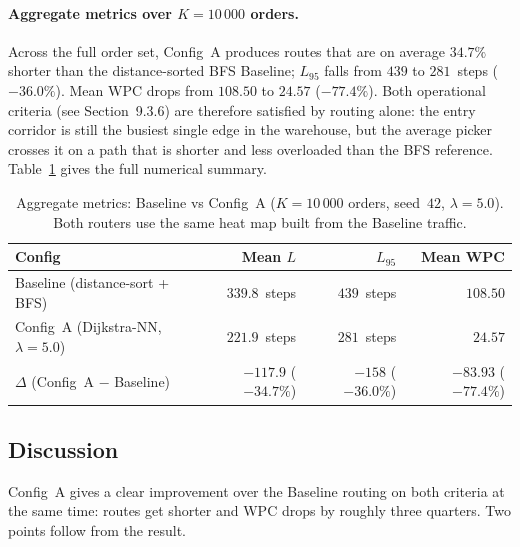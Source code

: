 \documentclass[12pt,a4paper]{article}
\begin{document}
\paragraph{Aggregate metrics over $K = 10\,000$ orders.}
Across the full order set, Config~A produces routes that are on average
$34.7\%$ shorter than the distance-sorted BFS Baseline; $L_{95}$ falls from
$439$ to $281$~steps ($-36.0\%$).
Mean WPC drops from $108.50$ to $24.57$ ($-77.4\%$).
Both operational criteria (see Section~9.3.6) are therefore satisfied by
routing alone: the entry corridor is still the busiest single edge in the
warehouse, but the average picker crosses it on a path that is shorter
and less overloaded than the BFS reference.
Table~\ref{tab:metrics_aggregate} gives the full numerical summary.

\begin{table}[!ht]
\centering
\caption{Aggregate metrics: Baseline vs Config~A ($K = 10\,000$ orders,
  seed~$42$, $\lambda = 5.0$). Both routers use the same heat map built
  from the Baseline traffic.}
\label{tab:metrics_aggregate}
\begin{tabular}{lrrr}
\hline
\textbf{Config} & \textbf{Mean $L$} & \textbf{$L_{95}$} & \textbf{Mean WPC} \\
\hline
Baseline (distance-sort + BFS)            & $339.8$~steps & $439$~steps & $108.50$ \\
Config~A (Dijkstra-NN, $\lambda = 5.0$)   & $221.9$~steps & $281$~steps & $24.57$ \\
\hline
$\Delta$ (Config~A $-$ Baseline)          & $-117.9$ ($-34.7\%$) & $-158$ ($-36.0\%$) & $-83.93$ ($-77.4\%$) \\
\hline
\end{tabular}
\end{table}

\subsection{Discussion}
\label{sec:discussion_A}

Config~A gives a clear improvement over the Baseline routing on both
criteria at the same time: routes get shorter and WPC drops by roughly
three quarters.
Two points follow from the result.
\end{document}
